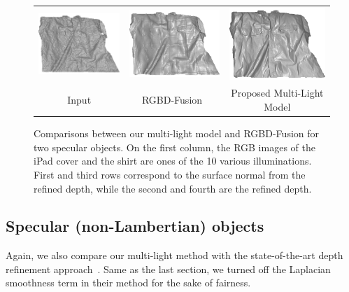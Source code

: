 \begin{figure}[!ht]
{\begin{tabular}{c|c c}
   \includegraphics[height = 0.23\linewidth]{figures/result/robust_patternShirt_shape_init.pdf} 
   &
   \includegraphics[height = 0.23\linewidth]{figures/result/rgbd_patternShirt_shape.pdf} &
   \includegraphics[height = 0.23\linewidth]{figures/result/robust_patternShirt_shape.pdf}\\

   {Input} & {RGBD-Fusion~\cite{or2015rgbd}} & {Proposed Multi-Light Model}               
 \end{tabular}}
\caption{Comparisons between our multi-light model and RGBD-Fusion for two specular objects. On the first column, the RGB images of the iPad cover and the shirt are ones of the 10 various illuminations. First and third rows correspond to the surface normal from the refined depth, while the second and fourth are the refined depth.}
\label{fig:comp_complicated_albedo}
\end{figure}

\subsection{Specular (non-Lambertian) objects}
Again, we also compare our multi-light method with the state-of-the-art depth refinement approach~\cite{or2015rgbd}.
Same as the last section, we turned off the Laplacian smoothness term in their method for the sake of fairness.

